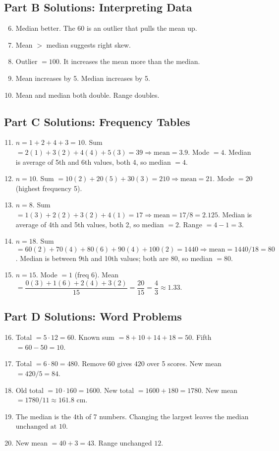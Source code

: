 \documentclass[12pt]{article}
\begin{document}
\subsection*{Part B Solutions: Interpreting Data}
\begin{enumerate}
  \setcounter{enumi}{5}
  \item Median better. The 60 is an outlier that pulls the mean up.
  \item Mean \(>\) median suggests right skew.
  \item Outlier \(=100\). It increases the mean more than the median.
  \item Mean increases by 5. Median increases by 5.
  \item Mean and median both double. Range doubles.
\end{enumerate}

\subsection*{Part C Solutions: Frequency Tables}
\begin{enumerate}
  \setcounter{enumi}{10}
  \item \(n=1+2+4+3=10\). Sum \(=2(1)+3(2)+4(4)+5(3)=39\Rightarrow \text{mean}=3.9\). Mode \(=4\). Median is average of 5th and 6th values, both 4, so median \(=4\).
  \item \(n=10\). Sum \(=10(2)+20(5)+30(3)=210\Rightarrow \text{mean}=21\). Mode \(=20\) (highest frequency 5).
  \item \(n=8\). Sum \(=1(3)+2(2)+3(2)+4(1)=17\Rightarrow \text{mean}=17/8=2.125\). Median is average of 4th and 5th values, both 2, so median \(=2\). Range \(=4-1=3\).
  \item \(n=18\). Sum \(=60(2)+70(4)+80(6)+90(4)+100(2)=1440\Rightarrow \text{mean}=1440/18=80\). Median is between 9th and 10th values; both are 80, so median \(=80\).
  \item \(n=15\). Mode \(=1\) (freq 6). Mean \(=\dfrac{0(3)+1(6)+2(4)+3(2)}{15}=\dfrac{20}{15}=\dfrac{4}{3}\approx1.33\).
\end{enumerate}

\subsection*{Part D Solutions: Word Problems}
\begin{enumerate}
  \setcounter{enumi}{15}
  \item Total \(=5\cdot12=60\). Known sum \(=8+10+14+18=50\). Fifth \(=60-50=\boxed{10}\).
  \item Total \(=6\cdot80=480\). Remove 60 gives \(420\) over 5 scores. New mean \(=420/5=\boxed{84}\).
  \item Old total \(=10\cdot160=1600\). New total \(=1600+180=1780\). New mean \(=1780/11\approx\boxed{161.8\text{ cm}}\).
  \item The median is the 4th of 7 numbers. Changing the largest leaves the median \(\boxed{\text{unchanged at }10}\).
  \item New mean \(=40+3=\boxed{43}\). Range unchanged \(\boxed{12}\).
\end{enumerate}
\end{document}
